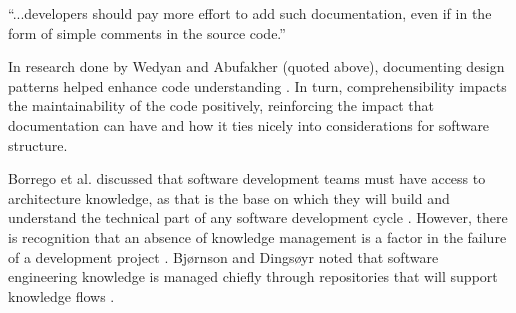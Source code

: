 \begin{displayquote}
  ``...developers should pay more effort to add such documentation, even if in the form of simple comments in the source code.''
\end{displayquote}
\vspace{0.25cm}

In research done by Wedyan and Abufakher (quoted above), documenting design patterns helped enhance code understanding \cite{wedyan:2020}. In turn, comprehensibility impacts the maintainability of the code positively, reinforcing the impact that documentation can have and how it ties nicely into considerations for software structure.

Borrego et al. discussed that software development teams must have access to architecture knowledge, as that is the base on which they will build and understand the technical part of any software development cycle \cite{borrego:2017}. However, there is recognition that an absence of knowledge management is a factor in the failure of a development project \cite{borrego:2017}. Bjørnson and Dingsøyr noted that software engineering knowledge is managed chiefly through repositories that will support knowledge flows \cite{bjornson:2008}.
